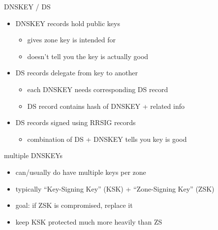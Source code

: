 \begin{frame}{DNSKEY / DS}
\begin{itemize}
    \item DNSKEY records hold public keys
        \begin{itemize}
        \item gives zone key is intended for
        \item doesn't tell you the key is actually good
        \end{itemize}
    \item DS records delegate from key to another
        \begin{itemize}
        \item each DNSKEY needs corresponding DS record
        \item DS record contains hash of DNSKEY + related info
        \end{itemize}
    \item DS records signed using RRSIG records
        \begin{itemize}
        \item combination of DS + DNSKEY tells you key is good
        \end{itemize}
\end{itemize}
\end{frame}

\begin{frame}{multiple DNSKEYs}
    \begin{itemize}
    \item can/usually do have multiple keys per zone
    \item typically ``Key-Signing Key'' (KSK) + ``Zone-Signing Key'' (ZSK)
    \item goal: if ZSK is compromised, replace it
    \item keep KSK protected much more heavily than ZS
    \end{itemize}
\end{frame}

